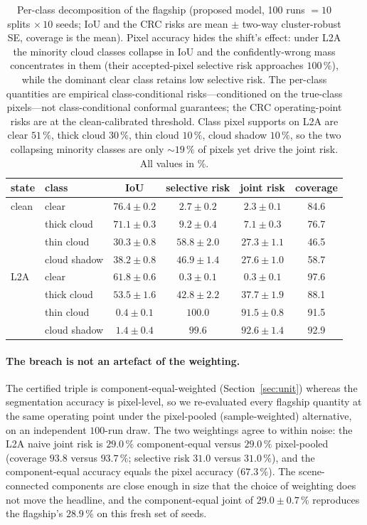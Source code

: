 \documentclass[preprint,3p,times]{elsarticle}
\begin{document}
\begin{table}[t]
\centering
\caption{Per-class decomposition of the flagship (proposed model, 100 runs $=10$ splits $\times\,10$ seeds; IoU and the CRC risks are mean $\pm$ two-way cluster-robust SE, coverage is the mean). Pixel accuracy hides the shift's effect: under L2A the minority cloud classes collapse in IoU and the confidently-wrong mass concentrates in them (their accepted-pixel selective risk approaches $100\,\%$), while the dominant clear class retains low selective risk. The per-class quantities are empirical class-conditional risks---conditioned on the true-class pixels---not class-conditional conformal guarantees; the CRC operating-point risks are at the clean-calibrated threshold. Class pixel supports on L2A are clear $51\,\%$, thick cloud $30\,\%$, thin cloud $10\,\%$, cloud shadow $10\,\%$, so the two collapsing minority classes are only ${\sim}19\,\%$ of pixels yet drive the joint risk. All values in \%.}
\label{tab:classwise}
\begin{tabular}{llcccc}
\toprule
state & class & IoU & selective risk & joint risk & coverage \\
\midrule
clean & clear        & $76.4\pm0.2$ & $2.7\pm0.2$ & $2.3\pm0.1$ & 84.6 \\
      & thick cloud  & $71.1\pm0.3$ & $9.2\pm0.4$ & $7.1\pm0.3$ & 76.7 \\
      & thin cloud   & $30.3\pm0.8$ & $58.8\pm2.0$ & $27.3\pm1.1$ & 46.5 \\
      & cloud shadow & $38.2\pm0.8$ & $46.9\pm1.4$ & $27.6\pm1.0$ & 58.7 \\
\midrule
L2A   & clear        & $61.8\pm0.6$ & $0.3\pm0.1$ & $0.3\pm0.1$ & 97.6 \\
      & thick cloud  & $53.5\pm1.6$ & $42.8\pm2.2$ & $37.7\pm1.9$ & 88.1 \\
      & thin cloud   & $\mathbf{0.4\pm0.1}$ & $\mathbf{100.0}$ & $91.5\pm0.8$ & 91.5 \\
      & cloud shadow & $\mathbf{1.4\pm0.4}$ & $\mathbf{99.6}$ & $92.6\pm1.4$ & 92.9 \\
\bottomrule
\end{tabular}
\end{table}

\paragraph{The breach is not an artefact of the weighting.} The certified triple is component-equal-weighted (Section~\ref{sec:unit}) whereas the segmentation accuracy is pixel-level, so we re-evaluated every flagship quantity at the same operating point under the pixel-pooled (sample-weighted) alternative, on an independent $100$-run draw. The two weightings agree to within noise: the L2A naive joint risk is $29.0\,\%$ component-equal versus $29.0\,\%$ pixel-pooled (coverage $93.8$ versus $93.7\,\%$; selective risk $31.0$ versus $31.0\,\%$), and the component-equal accuracy equals the pixel accuracy ($67.3\,\%$). The scene-connected components are close enough in size that the choice of weighting does not move the headline, and the component-equal joint of $29.0 \pm 0.7\,\%$ reproduces the flagship's $28.9\,\%$ on this fresh set of seeds.
\end{document}
